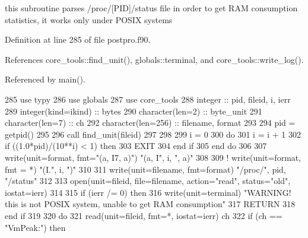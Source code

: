 this subroutine parses /proc/[P\+ID]/status file in order to get R\+AM consumption statistics, it works only under P\+O\+S\+IX systems 



Definition at line 285 of file postpro.\+f90.



References core\+\_\+tools\+::find\+\_\+unit(), globals\+::terminal, and core\+\_\+tools\+::write\+\_\+log().



Referenced by main().


\begin{DoxyCode}
285     \textcolor{keywordtype}{use }typy
286     \textcolor{keywordtype}{use }globals
287     \textcolor{keywordtype}{use }core_tools
288     \textcolor{keywordtype}{integer} :: pid, fileid, i, ierr
289     \textcolor{keywordtype}{integer(kind=ikind)} :: bytes
290     \textcolor{keywordtype}{character(len=2)} :: byte\_unit
291     \textcolor{keywordtype}{character(len=7)} :: ch
292     \textcolor{keywordtype}{character(len=256)} :: filename, format
293 
294     pid = getpid()
295 
296     \textcolor{keyword}{call }find_unit(fileid)
297 
298 
299     i = 0
300     \textcolor{keywordflow}{do}
301       i = i + 1
302       \textcolor{keywordflow}{if} ((1.0*pid)/(10**i) < 1) \textcolor{keywordflow}{then}
303         \textcolor{keywordflow}{EXIT}
304 \textcolor{keywordflow}{      end if}
305 \textcolor{keywordflow}{    end do}
306 
307     \textcolor{keyword}{write}(unit=\textcolor{keyword}{format}, fmt=\textcolor{stringliteral}{"(a, I7, a)"}) \textcolor{stringliteral}{"(a, I"}, i, \textcolor{stringliteral}{", a)"}
308 
309 \textcolor{comment}{!     write(unit=format, fmt = *) "(I.", i, ")"}
310 
311     \textcolor{keyword}{write}(unit=filename, fmt=format) \textcolor{stringliteral}{"/proc/"}, pid, \textcolor{stringliteral}{"/status"}
312     
313     \textcolor{keyword}{open}(unit=fileid, file=filename, action=\textcolor{stringliteral}{"read"}, status=\textcolor{stringliteral}{"old"}, iostat=ierr)
314 
315     \textcolor{keywordflow}{if} (ierr /= 0) \textcolor{keywordflow}{then}
316       \textcolor{keyword}{write}(unit=terminal) \textcolor{stringliteral}{"WARNING! this is not POSIX system, unable to get RAM consumption"}
317       \textcolor{keywordflow}{RETURN}
318 \textcolor{keywordflow}{    end if}
319 
320     \textcolor{keywordflow}{do} 
321       \textcolor{keyword}{read}(unit=fileid, fmt=*, iostat=ierr) ch
322       \textcolor{keywordflow}{if} (ch == \textcolor{stringliteral}{"VmPeak:"}) \textcolor{keywordflow}{then}

\end{DoxyCode}
